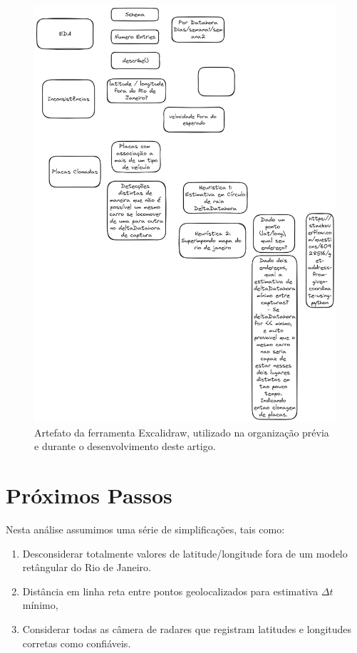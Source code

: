 \documentclass{article}
\begin{document}
\begin{figure}
    \centering
    \includegraphics[width=0.9\linewidth]{excalidraw.png}
    \caption{Artefato da ferramenta Excalidraw, utilizado na organização prévia e durante o desenvolvimento deste artigo.}
    \label{fig:excalidraw}
\end{figure}

\section{Próximos Passos}

Nesta análise assumimos uma série de simplificações, tais como:
\begin{enumerate}
\item Desconsiderar totalmente valores de latitude/longitude fora de um modelo retângular do Rio de Janeiro.
\item Distância em linha reta entre pontos geolocalizados para estimativa $ \Delta t $ mínimo,
\item Considerar todas as câmera de radares que registram latitudes e longitudes corretas como confiáveis.
\end{enumerate}
\end{document}
